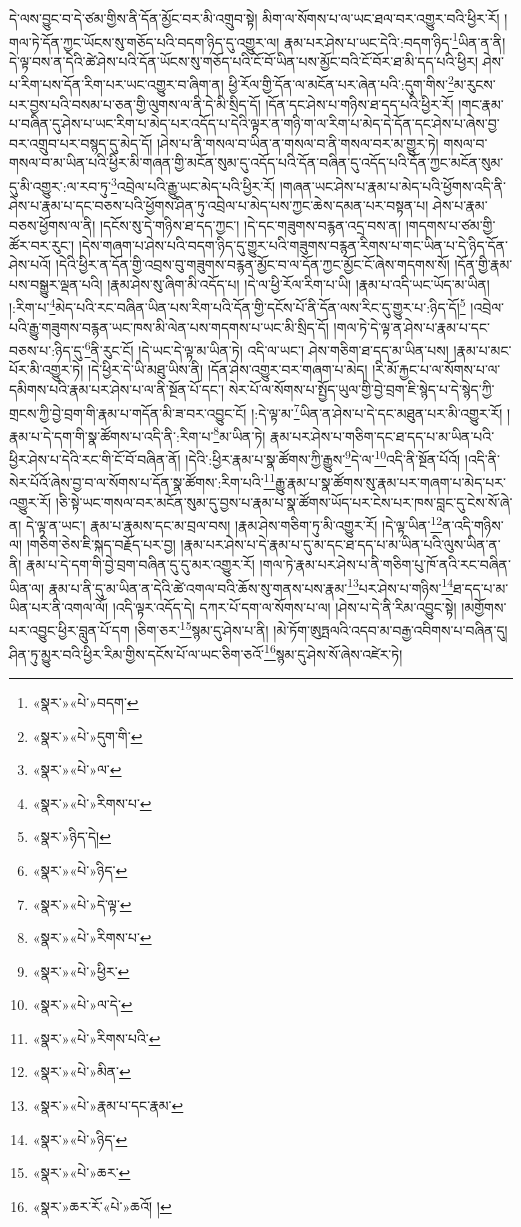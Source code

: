 དེ་ལས་བྱུང་བ་དེ་ཙམ་གྱིས་ནི་དོན་མྱོང་བར་མི་འགྲུབ་སྟེ། མིག་ལ་སོགས་པ་ལ་ཡང་ཐལ་བར་འགྱུར་བའི་ཕྱིར་རོ། །གལ་ཏེ་དོན་ཀྱང་ཡོངས་སུ་གཅོད་པའི་བདག་ཉིད་དུ་འགྱུར་ལ། རྣམ་པར་ཤེས་པ་ཡང་དེའི་:བདག་ཉིད་\footnote{«སྣར་»«པེ་»བདག་}ཡིན་ན་ནི། དེ་ལྟ་བས་ན་དེའི་ཚེ་ཤེས་པའི་དོན་ཡོངས་སུ་གཅོད་པའི་ངོ་བོ་ཡིན་པས་མྱོང་བའི་ངོ་བོར་ཐ་མི་དད་པའི་ཕྱིར། ཤེས་པ་རིག་པས་དོན་རིག་པར་ཡང་འགྱུར་བ་ཞིག་ན། ཕྱི་རོལ་གྱི་དོན་ལ་མངོན་པར་ཞེན་པའི་:དུག་གིས་\footnote{«སྣར་»«པེ་»དུག་གི་}མ་རུངས་པར་བྱས་པའི་བསམ་པ་ཅན་གྱི་ལུགས་ལ་ནི་དེ་མི་སྲིད་དོ། །དོན་དང་ཤེས་པ་གཉིས་ཐ་དད་པའི་ཕྱིར་རོ། །གང་རྣམ་པ་བཞིན་དུ་ཤེས་པ་ཡང་རིག་པ་མེད་པར་འདོད་པ་དེའི་ལྟར་ན་གཉི་ག་ལ་རིག་པ་མེད་དེ་དོན་དང་ཤེས་པ་ཞེས་བྱ་བར་འགྲུབ་པར་བསྙད་དུ་མེད་དོ། །ཤེས་པ་ནི་གསལ་བ་ཡིན་ན་གསལ་བ་ནི་གསལ་བར་མ་གྱུར་ཏེ། གསལ་བ་གསལ་བ་མ་ཡིན་པའི་ཕྱིར་མི་གཞན་གྱི་མངོན་སུམ་དུ་འདོད་པའི་དོན་བཞིན་དུ་འདོད་པའི་དོན་ཀྱང་མངོན་སུམ་དུ་མི་འགྱུར་:ལ་རབ་ཏུ་\footnote{«སྣར་»«པེ་»ལ་}འབྲེལ་པའི་རྒྱུ་ཡང་མེད་པའི་ཕྱིར་རོ། །གཞན་ཡང་ཤེས་པ་རྣམ་པ་མེད་པའི་ཕྱོགས་འདི་ནི་ཤེས་པ་རྣམ་པ་དང་བཅས་པའི་ཕྱོགས་ཤིན་ཏུ་འབྲེལ་པ་མེད་པས་ཀྱང་ཆེས་དམན་པར་བསྟན་པ། ཤེས་པ་རྣམ་བཅས་ཕྱོགས་ལ་ནི། །དངོས་སུ་དེ་གཉིས་ཐ་དད་ཀྱང་། །དེ་དང་གཟུགས་བརྙན་འདྲ་བས་ན། །གདགས་པ་ཙམ་གྱི་ཚོར་བར་རུང་། །དེས་གཞག་པ་ཤེས་པའི་བདག་ཉིད་དུ་གྱུར་པའི་གཟུགས་བརྙན་རིགས་པ་གང་ཡིན་པ་དེ་ཉིད་དོན་ཤེས་པའོ། །དེའི་ཕྱིར་ན་དོན་གྱི་འབྲས་བུ་གཟུགས་བརྙན་མྱོང་བ་ལ་དོན་ཀྱང་མྱོང་ངོ་ཞེས་གདགས་སོ། །དོན་གྱི་རྣམ་པས་བསྒྱུར་ལྡན་པའི། །རྣམ་ཤེས་སུ་ཞིག་མི་འདོད་པ། །དེ་ལ་ཕྱི་རོལ་རིག་པ་ཡི། །རྣམ་པ་འདི་ཡང་ཡོད་མ་ཡིན། །:རིག་པ་\footnote{«སྣར་»«པེ་»རིགས་པ་}མེད་པའི་རང་བཞིན་ཡིན་པས་རིག་པའི་དོན་གྱི་དངོས་པོ་ནི་དོན་ལས་རིང་དུ་གྱུར་པ་:ཉིད་དོ།\footnote{«སྣར་»ཉིད་དེ།} །འབྲེལ་པའི་རྒྱུ་གཟུགས་བརྙན་ཡང་ཁས་མི་ལེན་པས་གདགས་པ་ཡང་མི་སྲིད་དོ། །གལ་ཏེ་དེ་ལྟ་ན་ཤེས་པ་རྣམ་པ་དང་བཅས་པ་:ཉིད་དུ་\footnote{«སྣར་»«པེ་»ཉིད་}ནི་རུང་ངོ། །དེ་ཡང་དེ་ལྟ་མ་ཡིན་ཏེ། འདི་ལ་ཡང་། ཤེས་གཅིག་ཐ་དད་མ་ཡིན་པས། །རྣམ་པ་མང་པོར་མི་འགྱུར་ཏེ། །དེ་ཕྱིར་དེ་ཡི་མཐུ་ཡིས་ནི། །དོན་ཤེས་འགྱུར་བར་གཞག་པ་མེད། །རི་མོ་རྐྱང་པ་ལ་སོགས་པ་ལ་དམིགས་པའི་རྣམ་པར་ཤེས་པ་ལ་ནི་སྔོན་པོ་དང་། སེར་པོ་ལ་སོགས་པ་སྤྱོད་ཡུལ་གྱི་བྱེ་བྲག་ཇི་སྙེད་པ་དེ་སྙེད་ཀྱི་གྲངས་ཀྱི་བྱེ་བྲག་གི་རྣམ་པ་གདོན་མི་ཟ་བར་འབྱུང་ངོ། །:དེ་ལྟ་མ་\footnote{«སྣར་»«པེ་»དེ་ལྟ་}ཡིན་ན་ཤེས་པ་དེ་དང་མཐུན་པར་མི་འགྱུར་རོ། །རྣམ་པ་དེ་དག་གི་སྣ་ཚོགས་པ་འདི་ནི་:རིག་པ་\footnote{«སྣར་»«པེ་»རིགས་པ་}མ་ཡིན་ཏེ། རྣམ་པར་ཤེས་པ་གཅིག་དང་ཐ་དད་པ་མ་ཡིན་པའི་ཕྱིར་ཤེས་པ་དེའི་རང་གི་ངོ་བོ་བཞིན་ནོ། །དེའི་:ཕྱིར་རྣམ་པ་སྣ་ཚོགས་ཀྱི་རྒྱུས་\footnote{«སྣར་»«པེ་»ཕྱིར་}དེ་ལ་\footnote{«སྣར་»«པེ་»ལ་དེ་}འདི་ནི་སྔོན་པོའོ། །འདི་ནི་སེར་པོའོ་ཞེས་བྱ་བ་ལ་སོགས་པ་དོན་སྣ་ཚོགས་:རིག་པའི་\footnote{«སྣར་»«པེ་»རིགས་པའི་}རྒྱུ་རྣམ་པ་སྣ་ཚོགས་སུ་རྣམ་པར་གཞག་པ་མེད་པར་འགྱུར་རོ། །ཅི་སྟེ་ཡང་གསལ་བར་མངོན་སུམ་དུ་བྱས་པ་རྣམ་པ་སྣ་ཚོགས་ཡོད་པར་ངེས་པར་ཁས་བླང་དུ་ངེས་སོ་ཞེ་ན། དེ་ལྟ་ན་ཡང་། རྣམ་པ་རྣམས་དང་མ་བྲལ་བས། །རྣམ་ཤེས་གཅིག་ཏུ་མི་འགྱུར་རོ། །དེ་ལྟ་ཡིན་\footnote{«སྣར་»«པེ་»མིན་}ན་འདི་གཉིས་ལ། །གཅིག་ཅེས་ཇི་སྐད་བརྗོད་པར་བྱ། །རྣམ་པར་ཤེས་པ་དེ་རྣམ་པ་དུ་མ་དང་ཐ་དད་པ་མ་ཡིན་པའི་ལུས་ཡིན་ན་ནི། རྣམ་པ་དེ་དག་གི་བྱེ་བྲག་བཞིན་དུ་དུ་མར་འགྱུར་རོ། །གལ་ཏེ་རྣམ་པར་ཤེས་པ་ནི་གཅིག་པུ་ཁོ་ནའི་རང་བཞིན་ཡིན་ལ། རྣམ་པ་ནི་དུ་མ་ཡིན་ན་དེའི་ཚེ་འགལ་བའི་ཆོས་སུ་གནས་པས་རྣམ་\footnote{«སྣར་»«པེ་»རྣམ་པ་དང་རྣམ་}པར་ཤེས་པ་གཉིས་\footnote{«སྣར་»«པེ་»ཉིད་}ཐ་དད་པ་མ་ཡིན་པར་ནི་འགལ་ལོ། །འདི་ལྟར་འདོད་དེ། དཀར་པོ་དག་ལ་སོགས་པ་ལ། །ཤེས་པ་དེ་ནི་རིམ་འབྱུང་སྟེ། །མགྱོགས་པར་འབྱུང་ཕྱིར་བླུན་པོ་དག །ཅིག་ཅར་\footnote{«སྣར་»«པེ་»ཆར་}སྙམ་དུ་ཤེས་པ་ནི། །མེ་ཏོག་ཨུཏྤལའི་འདབ་མ་བརྒྱ་འབིགས་པ་བཞིན་དུ། ཤིན་ཏུ་མྱུར་བའི་ཕྱིར་རིམ་གྱིས་དངོས་པོ་ལ་ཡང་ཅིག་ཅའོ་\footnote{«སྣར་»ཆར་རོ་«པེ་»ཆའོ། །}སྙམ་དུ་ཤེས་སོ་ཞེས་འཛེར་ཏེ། 